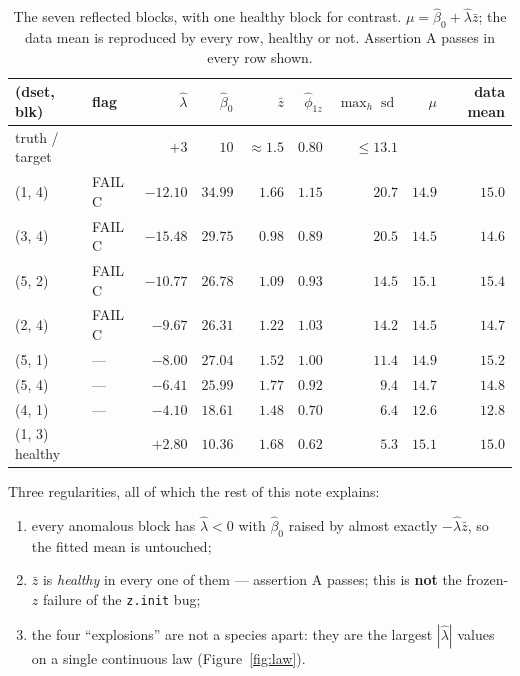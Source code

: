 \documentclass[11pt]{article}
\newcommand{\code}[1]{\texttt{#1}}
\DeclareMathOperator{\sd}{sd}
\begin{document}
\begin{table}[ht]
\centering
\caption{The seven reflected blocks, with one healthy block for contrast.
$\mu = \hat\beta_0 + \hat\lambda \bar z$; the data mean is reproduced by every
row, healthy or not. Assertion A passes in every row shown.}
\label{tab:refl}
\begin{tabular}{llrrrrrrr}
\toprule
(dset, blk) & flag & $\hat\lambda$ & $\hat\beta_0$ & $\bar z$ & $\hat\phi_{1z}$ &
$\max_h \sd$ & $\mu$ & data mean \\
\midrule
truth / target & & $+3$ & $10$ & $\approx 1.5$ & $0.80$ & $\le 13.1$ & & \\
\midrule
(1, 4) & FAIL C & $-12.10$ & $34.99$ & $1.66$ & $1.15$ & $20.7$ & $14.9$ & $15.0$ \\
(3, 4) & FAIL C & $-15.48$ & $29.75$ & $0.98$ & $0.89$ & $20.5$ & $14.5$ & $14.6$ \\
(5, 2) & FAIL C & $-10.77$ & $26.78$ & $1.09$ & $0.93$ & $14.5$ & $15.1$ & $15.4$ \\
(2, 4) & FAIL C & $-9.67$  & $26.31$ & $1.22$ & $1.03$ & $14.2$ & $14.5$ & $14.7$ \\
(5, 1) & ---    & $-8.00$  & $27.04$ & $1.52$ & $1.00$ & $11.4$ & $14.9$ & $15.2$ \\
(5, 4) & ---    & $-6.41$  & $25.99$ & $1.77$ & $0.92$ & $9.4$  & $14.7$ & $14.8$ \\
(4, 1) & ---    & $-4.10$  & $18.61$ & $1.48$ & $0.70$ & $6.4$  & $12.6$ & $12.8$ \\
\midrule
(1, 3) healthy & & $+2.80$ & $10.36$ & $1.68$ & $0.62$ & $5.3$ & $15.1$ & $15.0$ \\
\bottomrule
\end{tabular}
\end{table}

Three regularities, all of which the rest of this note explains:
\begin{enumerate}\itemsep2pt
  \item every anomalous block has $\hat\lambda < 0$ with $\hat\beta_0$ raised by
        almost exactly $-\hat\lambda \bar z$, so the fitted mean is untouched;
  \item $\bar z$ is \emph{healthy} in every one of them --- assertion A passes;
        this is \textbf{not} the frozen-$z$ failure of the \code{z.init} bug;
  \item the four ``explosions'' are not a species apart: they are the largest
        $|\hat\lambda|$ values on a single continuous law
        (Figure~\ref{fig:law}).
\end{enumerate}
\end{document}
